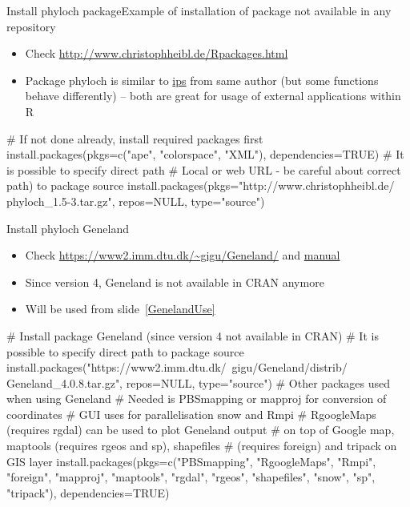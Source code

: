 \documentclass[compress, ucs, xelatex, 11pt, xcolor=svgnames,
  hyperref={
    bookmarks=true,
    unicode=true,
    colorlinks=true,
    pdftitle={Molecular data in R},
    plainpages=false,
    pdfauthor={Vojtech Zeisek},
    pdfsubject={Course about phylogeny and evolution in R},
    pdfcreator={XeLaTeX},
    pdfkeywords={R, evolution, phylogeny, molecular data},
    linkcolor=Tomato,
    anchorcolor=SaddleBrown,
    citecolor=Goldenrod,
    filecolor=DarkMagenta,
    menucolor=Sienna,
    urlcolor=DarkTurquoise,
    pdftex},
  url={hyphens, lowtilde} %
  ]{beamer}
\begin{document}
\begin{frame}[fragile]{Install phyloch package}{Example of installation of package not available in any repository}
  \label{phyloch}
  \begin{itemize}
    \item Check \url{http://www.christophheibl.de/Rpackages.html} 
    \item Package phyloch is similar to \href{https://CRAN.R-project.org/package=ips}{ips} from same author (but some functions behave differently) -- both are great for usage of external applications within R
  \end{itemize}
  \begin{spluscode}
    # If not done already, install required packages first
    install.packages(pkgs=c("ape", "colorspace", "XML"),
      dependencies=TRUE)
    # It is possible to specify direct path
    # Local or web URL - be careful about correct path) to package source
    install.packages(pkgs="http://www.christophheibl.de/
      phyloch_1.5-3.tar.gz", repos=NULL, type="source")
  \end{spluscode}
\end{frame}

\begin{frame}[fragile]{Install phyloch Geneland}
  \label{Geneland}
  \begin{itemize}
    \item Check \url{https://www2.imm.dtu.dk/~gigu/Geneland/} and \href{https://www2.imm.dtu.dk/~gigu/Geneland/Geneland-Doc.pdf}{manual}
    \item Since version 4, Geneland is not available in CRAN anymore
    \item Will be used from slide~\ref{GenelandUse}
  \end{itemize}
  \begin{spluscode}
    # Install package Geneland (since version 4 not available in CRAN)
    # It is possible to specify direct path to package source
    install.packages("https://www2.imm.dtu.dk/~gigu/Geneland/distrib/
      Geneland_4.0.8.tar.gz", repos=NULL, type="source")
    # Other packages used when using Geneland
    # Needed is PBSmapping or mapproj for conversion of coordinates
    # GUI uses for parallelisation snow and Rmpi
    # RgoogleMaps (requires rgdal) can be used to plot Geneland output
    # on top of Google map, maptools (requires rgeos and sp), shapefiles
    # (requires foreign) and tripack on GIS layer
    install.packages(pkgs=c("PBSmapping", "RgoogleMaps", "Rmpi", "foreign",
     "mapproj", "maptools", "rgdal", "rgeos", "shapefiles", "snow", "sp",
     "tripack"), dependencies=TRUE)
  \end{spluscode}
\end{frame}
\end{document}
